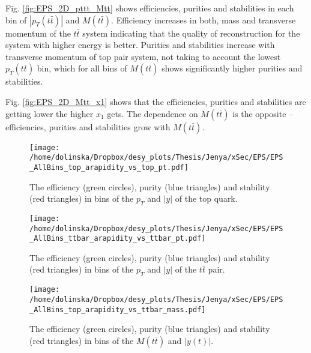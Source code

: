 Fig. \ref{fig:EPS_2D_pttt_Mtt} shows efficiencies, purities and stabilities in each bin of $|p_{T}(t\bar{t})|$ and $M(t\bar{t})$. Efficiency increases 
in both, mass and transverse momentum of the $t\bar{t}$ system indicating that the quality of reconstruction for the system with higher energy is better.
Purities and stabilities increase with transverse momentum of top pair system, not taking to account the lowest $p_{T}(t\bar{t})$ bin, which for all 
bins of $M(t\bar{t})$ shows significantly higher purities and stabilities.
% 

Fig. \ref{fig:EPS_2D_Mtt_x1} shows that the efficiencies, purities and stabilities are getting lower the higher $x_{1}$ gets. The dependence on $M(t\bar{t})$
is the opposite -- efficiencies, purities and stabilities grow with $M(t\bar{t})$.

\begin{figure}[h]
  \centering
  \texttt{[image: /home/dolinska/Dropbox/desy\_plots/Thesis/Jenya/xSec/EPS/EPS\_AllBins\_top\_arapidity\_vs\_top\_pt.pdf]}
  \caption{The efficiency (green circles), purity (blue triangles) and stability (red triangles) in bins of the $p_{T}$ and $|y|$ of the top quark.}
  \label{fig:EPS_2D_y_pt_ap}
\end{figure}

\begin{figure}[p]
  \centering
  \texttt{[image: /home/dolinska/Dropbox/desy\_plots/Thesis/Jenya/xSec/EPS/EPS\_AllBins\_ttbar\_arapidity\_vs\_ttbar\_pt.pdf]}
  \caption{The efficiency (green circles), purity (blue triangles) and stability (red triangles) in bins of the $p_{T}$ and $|y|$ of the $t\bar{t}$ pair.}
  \label{fig:EPS_2D_ptt_ytt}
\end{figure}

\begin{figure}[p]
  \centering
  \texttt{[image: /home/dolinska/Dropbox/desy\_plots/Thesis/Jenya/xSec/EPS/EPS\_AllBins\_top\_arapidity\_vs\_ttbar\_mass.pdf]}
  \caption{The efficiency (green circles), purity (blue triangles) and stability (red triangles) in bins of the $M(t\bar{t})$ and $|y(t)|$.}
  \label{fig:EPS_2D_Mtt_yt}
\end{figure}

